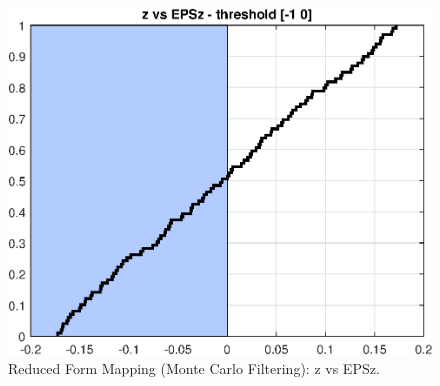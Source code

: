 
\begin{figure}[H]
\centering 
\includegraphics[width=1.00\textwidth]{RBC_kz/gsa/redform_prior/z_vs_EPSz_threshold/RBC_kz_prior_z_vs_EPSz}
\caption{Reduced Form Mapping (Monte Carlo Filtering): z vs EPSz.}\label{Fig:prior_z_vs_EPSz}
\end{figure}

